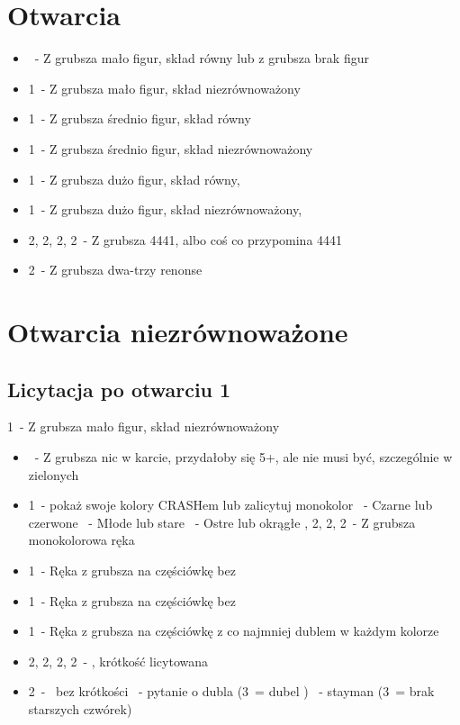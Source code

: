 \documentclass[12pt, a4paper]{article}
\begin{document}
\section{Otwarcia}
\begin{itemize}
    \item \pass\ - Z grubsza mało figur, skład równy lub z grubsza brak figur
    \item 1\clubs\ - Z grubsza mało figur, skład niezrównoważony
    \item 1\diams\ - Z grubsza średnio figur, skład równy
    \item 1\hearts\ - Z grubsza średnio figur, skład niezrównoważony
    \item 1\spades\ - Z grubsza dużo figur, skład równy, \fonce
    \item 1\nt\ - Z grubsza dużo figur, skład niezrównoważony, \fonce
    \br
    \item 2\clubs, 2\diams, 2\hearts, 2\spades\ - Z grubsza 4441, albo coś co przypomina 4441
    \item 2\nt\ - Z grubsza dwa-trzy renonse
\end{itemize}

\pagebreak
\section{Otwarcia niezrównoważone}
\subsection{Licytacja po otwarciu 1\clubs}
\begin{formal}
    1\clubs\ - Z grubsza mało figur, skład niezrównoważony
\end{formal}
\begin{itemize}
    \item \pass\ - Z grubsza nic w karcie, przydałoby się 5+\clubs, ale nie musi być, szczególnie w zielonych
    \item 1\diams\ - pokaż swoje kolory CRASHem lub zalicytuj monokolor
    \hearts\ - Czarne lub czerwone
    \spades\ - Młode lub stare
    \nt\ - Ostre lub okrągłe
    \clubs, 2\diams, 2\hearts, 2\spades\ - Z grubsza monokolorowa ręka
    \item 1\hearts\ - Ręka z grubsza na częściówkę bez \hearts
    \item 1\spades\ - Ręka z grubsza na częściówkę bez \spades
    \item 1\nt\ - Ręka z grubsza na częściówkę z co najmniej dublem w każdym kolorze
    \item 2\clubs, 2\diams, 2\hearts, 2\spades\ - \gf, krótkość licytowana
    \item 2\nt\ - \gf\ bez krótkości
    \clubs\ - pytanie o dubla (3\nt\ = dubel \clubs)
    \diams\ - stayman (3\nt\ = brak starszych czwórek)
\end{itemize}
\end{document}
